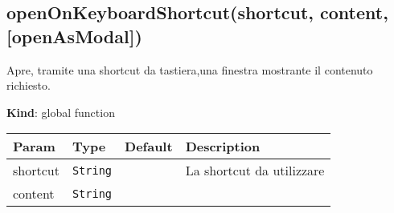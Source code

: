\hypertarget{openonkeyboardshortcutshortcut-content-openasmodal}{%
\subsection{openOnKeyboardShortcut(shortcut, content,
{[}openAsModal{]})}\label{openonkeyboardshortcutshortcut-content-openasmodal}}

Apre, tramite una shortcut da tastiera,una finestra mostrante il
contenuto richiesto.

\textbf{Kind}: global function

\begin{longtabu} to \textwidth {X[1,L,m]X[1,L,m]X[1.5,L,m]X[1.5,L,m]}
\toprule
\begin{minipage}[b]{0.22\columnwidth}\raggedright
Param\strut
\end{minipage} & \begin{minipage}[b]{0.22\columnwidth}\raggedright
Type\strut
\end{minipage} & \begin{minipage}[b]{0.22\columnwidth}\raggedright
Default\strut
\end{minipage} & \begin{minipage}[b]{0.22\columnwidth}\raggedright
Description\strut
\end{minipage}\tabularnewline
\midrule
\endhead
\begin{minipage}[t]{0.22\columnwidth}\raggedright
shortcut\strut
\end{minipage} & \begin{minipage}[t]{0.22\columnwidth}\raggedright
\texttt{String}\strut
\end{minipage} & \begin{minipage}[t]{0.22\columnwidth}\raggedright
\strut
\end{minipage} & \begin{minipage}[t]{0.22\columnwidth}\raggedright
La shortcut da utilizzare\strut
\end{minipage}\tabularnewline
\begin{minipage}[t]{0.22\columnwidth}\raggedright
content\strut
\end{minipage} & \begin{minipage}[t]{0.22\columnwidth}\raggedright
\texttt{String}\strut
\end{minipage} & \begin{minipage}[t]{0.22\columnwidth}\raggedright
\strut
\end{minipage} & \begin{minipage}[t]{0.22\columnwidth}\raggedright

\end{minipage}
\end{longtabu}
